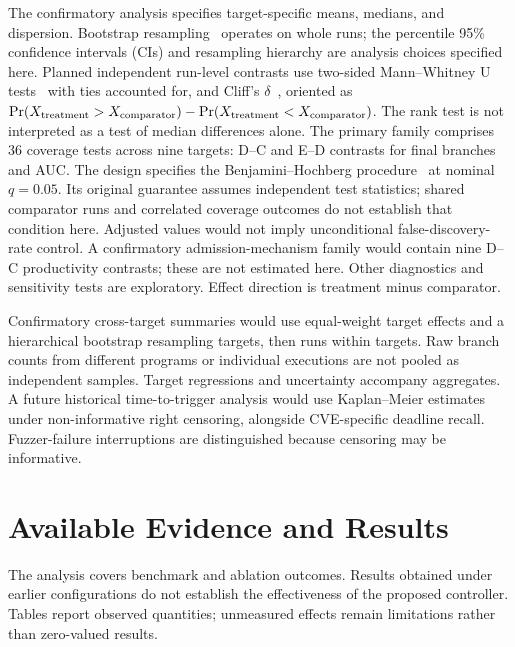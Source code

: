 \documentclass[final,5p,times,number]{elsarticle}
\begin{document}
The confirmatory analysis specifies target-specific means, medians, and dispersion. Bootstrap resampling~\cite{efron1979} operates on whole runs; the percentile 95\% confidence intervals (CIs) and resampling hierarchy are analysis choices specified here. Planned independent run-level contrasts use two-sided Mann--Whitney U tests~\cite{mann1947} with ties accounted for, and Cliff's $\delta$~\cite{cliff1993}, oriented as $\Pr(X_{\rm treatment}>X_{\rm comparator})-\Pr(X_{\rm treatment}<X_{\rm comparator})$. The rank test is not interpreted as a test of median differences alone. The primary family comprises 36 coverage tests across nine targets: D--C and E--D contrasts for final branches and AUC. The design specifies the Benjamini--Hochberg procedure~\cite{benjamini1995} at nominal $q=0.05$. Its original guarantee assumes independent test statistics; shared comparator runs and correlated coverage outcomes do not establish that condition here. Adjusted values would not imply unconditional false-discovery-rate control. A confirmatory admission-mechanism family would contain nine D--C productivity contrasts; these are not estimated here. Other diagnostics and sensitivity tests are exploratory. Effect direction is treatment minus comparator.

Confirmatory cross-target summaries would use equal-weight target effects and a hierarchical bootstrap resampling targets, then runs within targets. Raw branch counts from different programs or individual executions are not pooled as independent samples. Target regressions and uncertainty accompany aggregates. A future historical time-to-trigger analysis would use Kaplan--Meier estimates~\cite{kaplan1958} under non-informative right censoring, alongside CVE-specific deadline recall. Fuzzer-failure interruptions are distinguished because censoring may be informative.


\section{Available Evidence and Results}
\label{sec:results}
The analysis covers benchmark and ablation outcomes. Results obtained under earlier configurations do not establish the effectiveness of the proposed controller. Tables report observed quantities; unmeasured effects remain limitations rather than zero-valued results.
\end{document}
